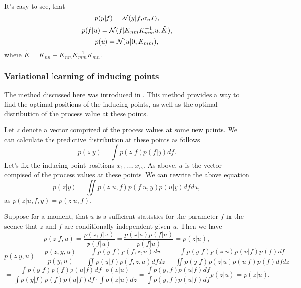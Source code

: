 \documentclass[12pt]{article}
\begin{document}
	
	It's easy to see, that
	$$p(y|f) = \mathcal{N} (y|f, \sigma_n I),$$
	$$p(f|u) = \mathcal{N} (f|K_{nm} K_{mm}^{-1}u, \tilde K),$$
	$$p(u) = \mathcal{N}(u|0, K_{mm}),$$
	where $\tilde K = K_{nn} - K_{nm} K_{mm}^{-1} K_{mn}.$
		
	\subsubsection{Variational learning of inducing points}
		\label{Titsias}
		
		\hspace{0.6cm}The method discussed here was introduced in \cite{Titsias}. This method provides a way to find the optimal positions of the inducing points, as well as the optimal distribution of the process value at these points.

		Let $z$ denote a vector comprized of the process values at some new points. We can calculate the predictive distribution at these points as follows
		$$p(z|y) = \int p(z|f) p(f|y) df.$$
		Let's fix the inducing point positions $x_1, \ldots, x_m$. As above, $u$ is the vector compised of the process values at these points. We can rewrite the above equation
		\begin{equation}
			\label{predictive1}
			p(z|y) = \iint p(z|u, f) p(f| u, y) p(u|y)df du,
		\end{equation}
		as $p(z|u, f, y) = p(z|u, f)$. 

		Suppose for a moment, that $u$ is a sufficient statistics for the parameter $f$ in the scence that $z$ and $f$ are conditionally independent given $u$. Then we have 
		$$p(z|f, u) = \frac {p(z, f|u)} {p(f|u)} = \frac {p(z | u) p(f | u)}{p(f|u)} = p(z|u),$$
		$$p(z|y, u) = \frac {p(z, y, u)}{p(y, u)} = \frac {\int p(y|f)p(f, z, u) du}{\iint p(y|f) p(f, z, u) df dz} = \frac {\int p(y|f) p(z|u) p(u|f) p(f)df}{\iint p(y|f) p(z|u) p(u|f) p(f)df dz} = $$
		$$= \frac {\int p(y|f)p(f)p(u|f)df \cdot p(z|u)} {\int p(y|f)p(f)p(u|f)df \cdot \int p(z|u) dz} = \frac{\int p(y, f) p(u|f) df} {\int p(y, f) p(u|f) df} p(z|u) = p(z|u).$$
\end{document}
